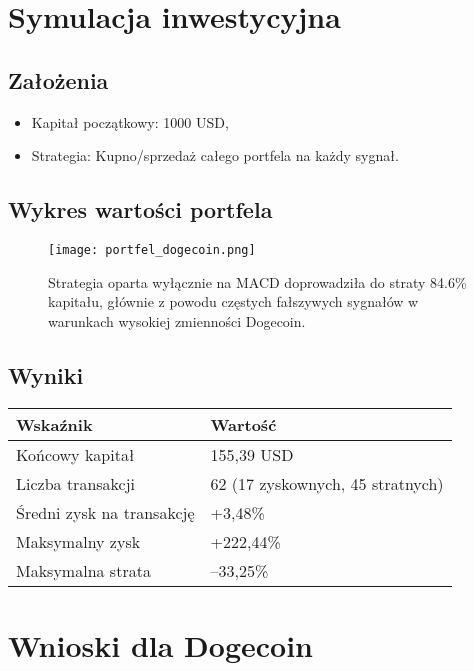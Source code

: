 \documentclass[a4paper,12pt]{article}
\begin{document}
\section{Symulacja inwestycyjna}
\subsection{Założenia}
\begin{itemize}
    \item Kapitał początkowy: 1000 USD,
    \item Strategia:  Kupno/sprzedaż całego portfela na każdy sygnał.
\end{itemize}

\subsection{Wykres wartości portfela}
\begin{figure}[H]
  \centering
  \texttt{[image: portfel\_dogecoin.png]}
  \par\vspace{0.5em}
  \parbox{0.9\textwidth}{\centering\small Strategia oparta wyłącznie na MACD doprowadziła do straty 84.6\% kapitału, głównie z powodu częstych fałszywych sygnałów w warunkach wysokiej zmienności Dogecoin.}
\end{figure}

\subsection{Wyniki}
\begin{table}[H]
\centering
\begin{tabular}{|p{6cm}|p{6cm}|}
\hline
\textbf{Wskaźnik} & \textbf{Wartość} \\
\hline
Końcowy kapitał & 155{,}39 USD \\
\hline
Liczba transakcji & 62 (17 zyskownych, 45 stratnych) \\
\hline
Średni zysk na transakcję & +3{,}48\% \\
\hline
Maksymalny zysk & +222{,}44\% \\
\hline
Maksymalna strata & –33{,}25\% \\
\hline
\end{tabular}
\end{table}

\section{Wnioski dla Dogecoin}
\end{document}
